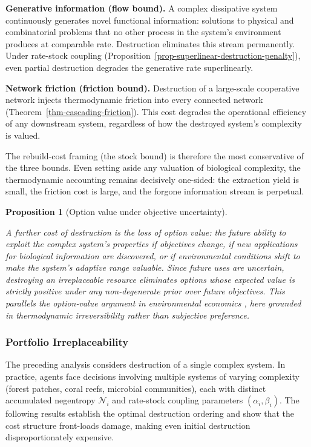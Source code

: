 \documentclass[11pt]{article}
\theoremstyle{plain}
\newtheorem{proposition}[theorem]{Proposition}
\theoremstyle{definition}
\theoremstyle{remark}
\let\origsubsubsection\subsubsection
\renewcommand{\subsubsection}{\needspace{4\baselineskip}\origsubsubsection}
\begin{document}
\textbf{Generative information (flow bound).} A complex dissipative
system continuously generates novel functional information: solutions to
physical and combinatorial problems that no other process in the
system's environment produces at comparable rate. Destruction eliminates
this stream permanently. Under rate-stock coupling
(Proposition~\ref{prop-superlinear-destruction-penalty}), even partial
destruction degrades the generative rate superlinearly.

\textbf{Network friction (friction bound).} Destruction of a large-scale
cooperative network injects thermodynamic friction into every connected
network (Theorem~\ref{thm-cascading-friction}). This cost degrades the
operational efficiency of any downstream system, regardless of how the
destroyed system's complexity is valued.

The rebuild-cost framing (the stock bound) is therefore the most
conservative of the three bounds. Even setting aside any valuation of
biological complexity, the thermodynamic accounting remains decisively
one-sided: the extraction yield is small, the friction cost is large,
and the forgone information stream is perpetual.

\begin{proposition}[Option value under objective uncertainty]
\label{rem-option-value}

A further cost of destruction is the loss of \emph{option value}: the future ability to exploit the complex system's properties if objectives change, if new applications for biological information are discovered, or if environmental conditions shift to make the system's adaptive range valuable. Since future uses are uncertain, destroying an irreplaceable resource eliminates options whose expected value is strictly positive under any non-degenerate prior over future objectives. This parallels the option-value argument in environmental economics \citep{ArrowFisher1974,DixitPindyck1994}, here grounded in thermodynamic irreversibility rather than subjective preference.
\end{proposition}

\subsubsection{Portfolio
Irreplaceability}\label{portfolio-irreplaceability}

The preceding analysis considers destruction of a single complex system.
In practice, agents face decisions involving multiple systems of varying
complexity (forest patches, coral reefs, microbial communities), each
with distinct accumulated negentropy \(\mathcal{N}_i\) and rate-stock
coupling parameters \((\alpha_i, \beta_i)\). The following results
establish the optimal destruction ordering and show that the cost
structure front-loads damage, making even initial destruction
disproportionately expensive.
\end{document}
